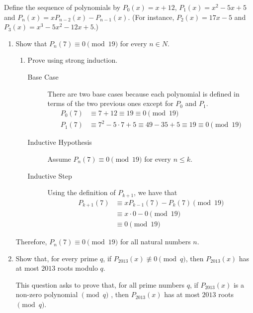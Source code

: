 \question Define the sequence of polynomials by $P_0(x) = x + 12$, 
$P_1(x) = x^2 - 5x + 5$ and $P_n(x) = xP_{n-2}(x) - P_{n-1}(x)$. 
(For instance, $P_2(x) = 17x-5$ and $P_3(x) = x^3 -5x^2 -12x+5$.) 
\begin{enumerate}[label=(\alph*)]
\item Show that $P_n(7) \equiv 0 \pmod{19}$ for every $n \in N$. 
\begin{solution}[1in]

\begin{enumerate}
\item Prove using strong induction.
\begin{description}
\item[Base Case] There are two base cases because each polynomial is 
defined in terms of the two previous ones except for $P_0$ and $P_1$.
\begin{equation}
\begin{split}
P_0(7) &\equiv 7 + 12 \equiv 19 \equiv 0 \pmod{19} \\ \nonumber
P_1(7) &\equiv 7^2 - 5\cdot 7 + 5 \equiv 49 - 35 + 5 \equiv 19 \equiv 
0 \pmod{19}
\end{split}
\end{equation}
\item[Inductive Hypothesis] Assume $P_n(7) \equiv 0 \pmod{19}$ for 
every $n \leq k$.
\item [Inductive Step] Using the definition of $P_{k+1}$, we have that 
\begin{equation}
\begin{split}
P_{k+1}(7) &\equiv xP_{k-1}(7) - P_k(7) \pmod{19} \\ \nonumber
&\equiv x \cdot 0 - 0 \pmod{19} \\
&\equiv 0 \pmod{19}
\end{split}
\end{equation}
\end{description}
\end{enumerate}
Therefore, $P_n(7) \equiv 0 \pmod{19}$ for all natural numbers $n$.
\end{solution}

\item Show that, for every prime $q$, if $P_{2013}(x) \not\equiv 0 
\pmod{q}$, then $P_{2013}(x)$ has at most $2013$ roots modulo $q$. 
\begin{solution}[2.5 in]
This question asks to prove that, for all prime numbers $q$, 
if $P_{2013}(x)$ is a non-zero polynomial $\pmod{q}$ , then $P_{2013}(x)$ 
has at most $2013$ roots $\pmod{q}$.


\end{solution}
\end{enumerate}
